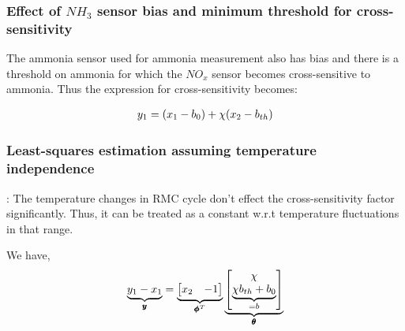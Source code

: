 \subsubsection{Effect of $NH_3$ sensor bias and minimum threshold for cross-sensitivity}

The ammonia sensor used for ammonia measurement also has bias and there is a
threshold on ammonia for which the $NO_x$ sensor becomes cross-sensitive to
ammonia. Thus the expression for cross-sensitivity becomes:

\begin{align*}
    y_1 &= \left( x_1 - b_0 \right) + \chi (x_2 - b_{th})\\
\end{align*}

\subsubsection{Least-squares estimation assuming temperature independence}
: The temperature changes in RMC cycle don't effect the
cross-sensitivity factor significantly. Thus, it can be treated as a constant
w.r.t temperature fluctuations in that range.

We have,
\begin{align*}
    \underbrace{y_1 - x_1}_{\pmb y} &= \underbrace{\begin{bmatrix} x_2 & -1 \end{bmatrix}}_{\pmb \phi^T} \underbrace{\begin{bmatrix}  \chi \\ \underbrace{\chi b_{th} + b_0}_{=b} \end{bmatrix}}_{ \pmb \theta}\\
\end{align*}

